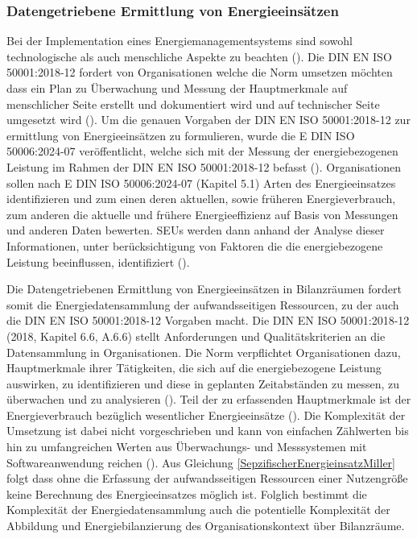 \subsubsection{Datengetriebene Ermittlung von Energieeinsätzen}

Bei der Implementation eines Energiemanagementsystems sind sowohl technologische als auch menschliche Aspekte zu beachten (\cite[S. 3]{Szajdzicki.2017}).
Die DIN EN ISO 50001:2018-12 fordert von Organisationen welche die Norm umsetzen möchten dass ein Plan zu Überwachung und Messung der Hauptmerkmale auf 
menschlicher Seite erstellt und dokumentiert wird und auf technischer Seite umgesetzt wird (\cite[S. 30ff.]{DIN50001.2018}).
Um die genauen Vorgaben der DIN EN ISO 50001:2018-12 zur ermittlung von Energieeinsätzen zu formulieren, wurde die E DIN ISO 50006:2024-07 veröffentlicht,
welche sich mit der Messung der energiebezogenen Leistung im Rahmen der DIN EN ISO 50001:2018-12 befasst (\cite[S. 1]{DIN50006.2024}).
Organisationen sollen nach E DIN ISO 50006:2024-07 (Kapitel 5.1) Arten des Energieeinsatzes identifizieren und zum einen deren aktuellen, sowie früheren 
Energieverbrauch, zum anderen die aktuelle und frühere Energieeffizienz auf Basis von Messungen und anderen Daten bewerten. 
SEUs werden dann anhand der Analyse dieser Informationen, unter berücksichtigung von Faktoren die die energiebezogene Leistung beeinflussen, 
identifiziert (\cite[Kapitel 5.1]{DIN50006.2024}). 

Die Datengetriebenen Ermittlung von Energieeinsätzen in Bilanzräumen fordert somit die Energiedatensammlung der aufwandsseitigen Ressourcen, zu der auch die DIN EN ISO 50001:2018-12 Vorgaben macht.
Die DIN EN ISO 50001:2018-12 (2018, Kapitel 6.6, A.6.6) stellt Anforderungen und Qualitätskriterien an die Datensammlung in Organisationen.
Die Norm verpflichtet Organisationen dazu, Hauptmerkmale ihrer Tätigkeiten, die sich auf die energiebezogene Leistung auswirken, zu identifizieren und diese in geplanten
Zeitabständen zu messen, zu überwachen und zu analysieren (\cite[S. 23]{DIN50001.2018}).
Teil der zu erfassenden Hauptmerkmale ist der Energieverbrauch bezüglich wesentlicher Energieeinsätze (\cite[S. 23]{DIN50001.2018}). 
Die Komplexität der Umsetzung ist dabei nicht vorgeschrieben und kann von einfachen Zählwerten bis hin zu umfangreichen Werten aus Überwachungs- und Messsystemen mit
Softwareanwendung reichen (\cite[S. 36]{DIN50001.2018}).
Aus Gleichung \eqref{SepzifischerEnergieinsatzMiller} folgt dass ohne die Erfassung der aufwandsseitigen Ressourcen einer Nutzengröße keine Berechnung des 
Energieeinsatzes möglich ist. 
Folglich bestimmt die Komplexität der Energiedatensammlung auch die potentielle Komplexität der Abbildung und Energiebilanzierung 
des Organisationskontext über Bilanzräume. 

